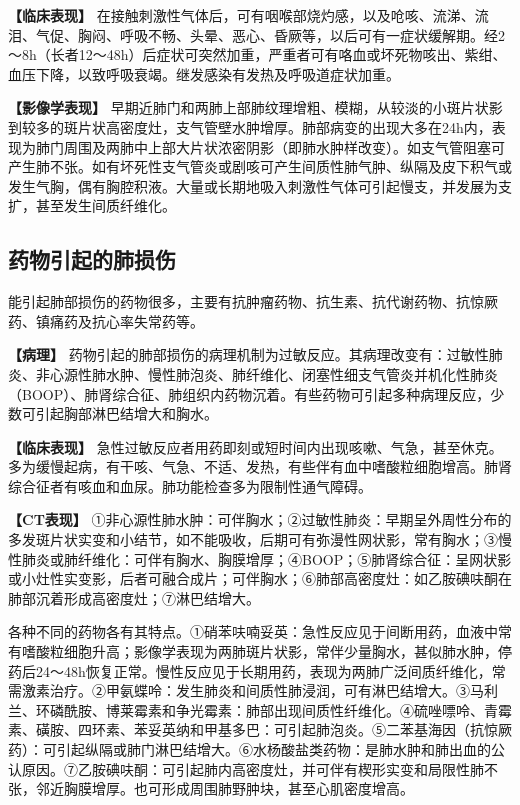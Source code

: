 \textbf{【临床表现】}
在接触刺激性气体后，可有咽喉部烧灼感，以及呛咳、流涕、流泪、气促、胸闷、呼吸不畅、头晕、恶心、昏厥等，以后可有一症状缓解期。经2～8h（长者12～48h）后症状可突然加重，严重者可有咯血或坏死物咳出、紫绀、血压下降，以致呼吸衰竭。继发感染有发热及呼吸道症状加重。

\textbf{【影像学表现】}
早期近肺门和两肺上部肺纹理增粗、模糊，从较淡的小斑片状影到较多的斑片状高密度灶，支气管壁水肿增厚。肺部病变的出现大多在24h内，表现为肺门周围及两肺中上部大片状浓密阴影（即肺水肿样改变）。如支气管阻塞可产生肺不张。如有坏死性支气管炎或剧咳可产生间质性肺气肿、纵隔及皮下积气或发生气胸，偶有胸腔积液。大量或长期地吸入刺激性气体可引起慢支，并发展为支扩，甚至发生间质纤维化。

\subsection{药物引起的肺损伤}

能引起肺部损伤的药物很多，主要有抗肿瘤药物、抗生素、抗代谢药物、抗惊厥药、镇痛药及抗心率失常药等。

\textbf{【病理】}
药物引起的肺部损伤的病理机制为过敏反应。其病理改变有：过敏性肺炎、非心源性肺水肿、慢性肺泡炎、肺纤维化、闭塞性细支气管炎并机化性肺炎（BOOP）、肺肾综合征、肺组织内药物沉着。有些药物可引起多种病理反应，少数可引起胸部淋巴结增大和胸水。

\textbf{【临床表现】}
急性过敏反应者用药即刻或短时间内出现咳嗽、气急，甚至休克。多为缓慢起病，有干咳、气急、不适、发热，有些伴有血中嗜酸粒细胞增高。肺肾综合征者有咳血和血尿。肺功能检查多为限制性通气障碍。

\textbf{【CT表现】}
①非心源性肺水肿：可伴胸水；②过敏性肺炎：早期呈外周性分布的多发斑片状实变和小结节，如不能吸收，后期可有弥漫性网状影，常有胸水；③慢性肺炎或肺纤维化：可伴有胸水、胸膜增厚；④BOOP；⑤肺肾综合征：呈网状影或小灶性实变影，后者可融合成片；可伴胸水；⑥肺部高密度灶：如乙胺碘呋酮在肺部沉着形成高密度灶；⑦淋巴结增大。

各种不同的药物各有其特点。①硝苯呋喃妥英：急性反应见于间断用药，血液中常有嗜酸粒细胞升高；影像学表现为两肺斑片状影，常伴少量胸水，甚似肺水肿，停药后24～48h恢复正常。慢性反应见于长期用药，表现为两肺广泛间质纤维化，常需激素治疗。②甲氨蝶呤：发生肺炎和间质性肺浸润，可有淋巴结增大。③马利兰、环磷酰胺、博莱霉素和争光霉素：肺部出现间质性纤维化。④硫唑嘌呤、青霉素、磺胺、四环素、苯妥英纳和甲基多巴：可引起肺泡炎。⑤二苯基海因（抗惊厥药）：可引起纵隔或肺门淋巴结增大。⑥水杨酸盐类药物：是肺水肿和肺出血的公认原因。⑦乙胺碘呋酮：可引起肺内高密度灶，并可伴有楔形实变和局限性肺不张，邻近胸膜增厚。也可形成周围肺野肿块，甚至心肌密度增高。

